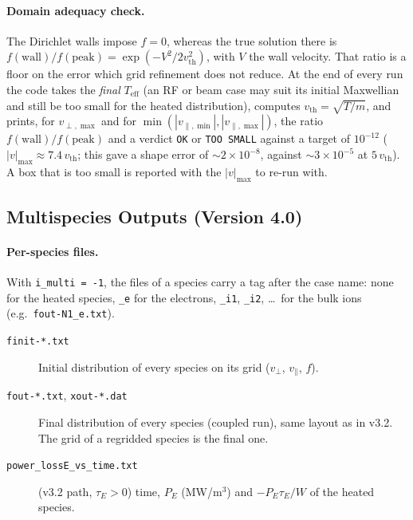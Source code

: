 \documentclass[11pt,a4paper]{article}
\newcommand{\vp}{v_\perp}
\newcommand{\vpa}{v_\parallel}
\newcommand{\vpmax}{v_{\perp,\max}}
\newcommand{\vpamin}{v_{\parallel,\min}}
\newcommand{\vpamax}{v_{\parallel,\max}}
\begin{document}
\paragraph{Domain adequacy check.}  The Dirichlet walls impose $f=0$, whereas
the true solution there is $f(\text{wall})/f(\text{peak}) =
\exp(-V^2/2v_\mathrm{th}^2)$, with $V$ the wall velocity.  That ratio is a floor
on the error which grid refinement does not reduce.  At the end of every run the
code takes the \emph{final} $T_\mathrm{eff}$ (an RF or beam case may suit its
initial Maxwellian and still be too small for the heated distribution),
computes $v_\mathrm{th}=\sqrt{T/m}$, and prints, for $\vpmax$ and for
$\min(|\vpamin|,|\vpamax|)$, the ratio $f(\text{wall})/f(\text{peak})$ and a
verdict \texttt{OK} or \texttt{TOO SMALL} against a target of $10^{-12}$
($|v|_{\max}\approx 7.4\,v_\mathrm{th}$; this gave a shape error of
${\sim}2\times10^{-8}$, against ${\sim}3\times10^{-5}$ at $5\,v_\mathrm{th}$).
A box that is too small is reported with the $|v|_{\max}$ to re-run with.


\subsection{Multispecies Outputs (Version 4.0)}
\label{sec:out_ms}

\paragraph{Per-species files.}  With \texttt{i\_multi = -1}, the files of a species carry a tag after
the case name: none for the heated species, \texttt{\_e} for the electrons, \texttt{\_i1},
\texttt{\_i2}, \dots\ for the bulk ions (e.g.\ \texttt{fout-N1\_e.txt}).
\begin{description}
\item[\texttt{finit-*.txt}] Initial distribution of every species on its grid
  ($\vp$, $\vpa$, $f$).
\item[\texttt{fout-*.txt}, \texttt{xout-*.dat}] Final distribution of every species (coupled run),
  same layout as in v3.2.  The grid of a regridded species is the final one.
\item[\texttt{power\_lossE\_vs\_time.txt}] (v3.2 path, $\tau_E>0$) time, $P_E$ (MW/m$^3$) and
  $-P_E\tau_E/W$ of the heated species.
\end{description}
\end{document}
